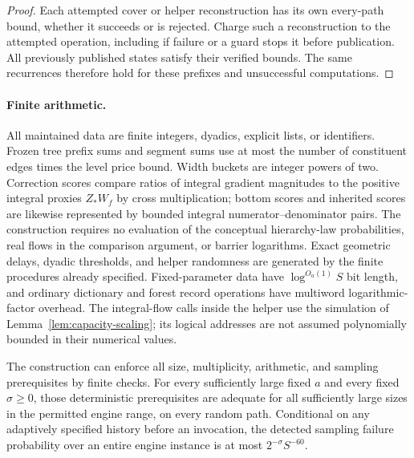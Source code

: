 \begin{proof}
Each attempted cover or helper reconstruction has its own
every-path bound, whether it succeeds or is rejected.  Charge
such a reconstruction to the attempted operation, including if
failure or a guard stops it before publication.  All previously
published states satisfy their verified bounds.  The same
recurrences therefore hold for these prefixes and unsuccessful
computations.
\end{proof}

\paragraph{Finite arithmetic.}
\label{update:arithmetic}
All maintained data are finite integers, dyadics, explicit lists,
or identifiers.  Frozen tree prefix sums and segment sums use
at most the number of constituent edges times the level price
bound.  Width buckets are integer powers of two.  Correction
scores compare ratios of integral gradient magnitudes to the
positive integral proxies $Z_*W_f$ by cross multiplication;
bottom scores and inherited scores are likewise represented by
bounded integral numerator--denominator pairs.  The construction
requires no evaluation of the conceptual hierarchy-law
probabilities, real flows in the comparison argument, or
barrier logarithms.  Exact geometric delays, dyadic thresholds,
and helper randomness are generated by the finite procedures
already specified.  Fixed-parameter data have
$\log^{O_a(1)} S$ bit length, and ordinary dictionary and forest
record operations have multiword logarithmic-factor overhead.
The integral-flow calls inside the helper use the simulation of
Lemma~\ref{lem:capacity-scaling}; its logical addresses are not
assumed polynomially bounded in their numerical values.

\begin{lemma}
\label{update:reliability}
The construction can enforce all size, multiplicity, arithmetic,
and sampling prerequisites by finite checks.  For every sufficiently
large fixed $a$ and every fixed $\sigma\ge0$, those deterministic prerequisites
are adequate for all sufficiently large sizes in the permitted
engine range, on every random path.  Conditional on any adaptively
specified history before an invocation, the detected sampling
failure probability over an entire engine instance is at most
$2^{-\sigma}S^{-60}$.
\end{lemma}

